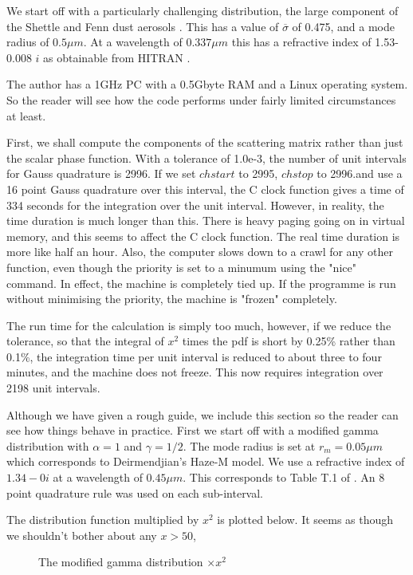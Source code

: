 \begin{flushleft}

We start off with a particularly challenging distribution, the large component
of the Shettle and Fenn dust aerosols \cite{ShettleFenn:Mybib}. This has
a value of $\overline \sigma$ of 0.475, and a mode radius of $0.5\mu m$.
At a wavelength of $0.337 \mu m$ this has a refractive index of 1.53-0.008 $i$
 as obtainable from  HITRAN \cite{RothmanETAL:Mybib}. 

The author has  a 1GHz PC with a 0.5Gbyte RAM and a Linux operating system.
 So the reader
will see how the code performs under fairly limited circumstances at least.

First, we shall compute the components of the scattering matrix rather than just the scalar phase function.
With a tolerance of 1.0e-3, the number of unit intervals for Gauss quadrature
is 2996.  If we set $chstart$ to 2995, $chstop$ to 2996.and use a 16 point Gauss quadrature over this interval, the C clock function gives a time of 334 seconds for the integration over the unit interval. However, in reality, the time duration is much longer than this.
There is heavy paging going on in virtual memory, and this seems to affect the C clock function. The real time duration is more like half an hour. Also, the computer slows down to a crawl for any other function, even though the priority is set to a minumum using the "nice" command. In effect, the machine is completely tied up. If the programme is run without minimising the priority, the machine is "frozen" completely. 

The run time for the calculation is simply too much, however, if we reduce the tolerance, so that the integral of $x^2$ times the pdf is short by 0.25\% rather than 0.1\%, the 
integration time per unit interval is reduced to about three to four minutes, and the machine does not freeze. This now requires integration over 2198 unit intervals.

Although we have given a rough guide, we include this section so the reader
can see how things behave in practice. First we start off with a modified 
gamma distribution with $\alpha=1$ and $\gamma=1/2$. The mode radius is
set at $r_m=0.05 \mu m$ which corresponds to Deirmendjian's Haze-M model.
We use a refractive index of $1.34-0 i$ at a wavelength of $0.45 \mu m$. This corresponds to Table T.1
of \cite{Deirmendjian:Mybib}. An 8 point quadrature rule 
was used on each sub-interval.

The distribution function multiplied by $x^2$ is plotted below. It seems
as though we shouldn't bother about any $x>50$, 
\vspace*{14cm}
\begin{figure}[htb]
\caption{ The modified gamma distribution $\times x^2$  }
\end{figure}


\end{flushleft}
